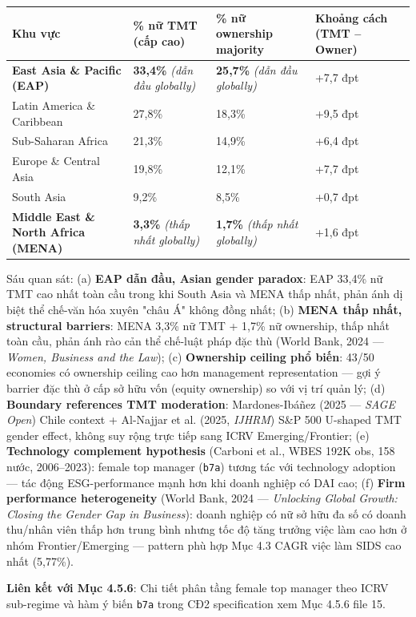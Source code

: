 \documentclass[12pt,a4paper]{article}
\begin{document}
\begin{longtable}[]{@{}llll@{}}
\toprule\noalign{}
Khu vực & \% nữ TMT (cấp cao) & \% nữ ownership majority & Khoảng cách
(TMT -- Owner) \\
\midrule\noalign{}
\endhead
\bottomrule\noalign{}
\endlastfoot
\textbf{East Asia \& Pacific (EAP)} & \textbf{33,4\%} \emph{(dẫn đầu
globally)} & \textbf{25,7\%} \emph{(dẫn đầu globally)} & +7,7 đpt \\
Latin America \& Caribbean & 27,8\% & 18,3\% & +9,5 đpt \\
Sub-Saharan Africa & 21,3\% & 14,9\% & +6,4 đpt \\
Europe \& Central Asia & 19,8\% & 12,1\% & +7,7 đpt \\
South Asia & 9,2\% & 8,5\% & +0,7 đpt \\
\textbf{Middle East \& North Africa (MENA)} & \textbf{3,3\%} \emph{(thấp
nhất globally)} & \textbf{1,7\%} \emph{(thấp nhất globally)} & +1,6
đpt \\
\end{longtable}

Sáu quan sát: (a) \textbf{EAP dẫn đầu, Asian gender paradox}: EAP 33,4\%
nữ TMT cao nhất toàn cầu trong khi South Asia và MENA thấp nhất, phản
ánh dị biệt thể chế-văn hóa xuyên "châu Á" không đồng nhất; (b)
\textbf{MENA thấp nhất, structural barriers}: MENA 3,3\% nữ TMT + 1,7\%
nữ ownership, thấp nhất toàn cầu, phản ánh rào cản thể chế-luật pháp đặc
thù (World Bank, 2024 --- \emph{Women, Business and the Law}); (c)
\textbf{Ownership ceiling phổ biến}: 43/50 economies có ownership
ceiling cao hơn management representation --- gợi ý barrier đặc thù ở
cấp sở hữu vốn (equity ownership) so với vị trí quản lý; (d)
\textbf{Boundary references TMT moderation}: Mardones-Ibáñez (2025 ---
\emph{SAGE Open}) Chile context + Al-Najjar et al. (2025, \emph{IJHRM})
S\&P 500 U-shaped TMT gender effect, không suy rộng trực tiếp sang ICRV
Emerging/Frontier; (e) \textbf{Technology complement hypothesis}
(Carboni et al., WBES 192K obs, 158 nước, 2006--2023): female top
manager (\texttt{b7a}) tương tác với technology adoption --- tác động
ESG-performance mạnh hơn khi doanh nghiệp có DAI cao; (f) \textbf{Firm
performance heterogeneity} (World Bank, 2024 --- \emph{Unlocking Global
Growth: Closing the Gender Gap in Business}): doanh nghiệp có nữ sở hữu
đa số có doanh thu/nhân viên thấp hơn trung bình nhưng tốc độ tăng
trưởng việc làm cao hơn ở nhóm Frontier/Emerging --- pattern phù hợp Mục
4.3 CAGR việc làm SIDS cao nhất (5,77\%).

\textbf{Liên kết với Mục 4.5.6}: Chi tiết phân tầng female top manager
theo ICRV sub-regime và hàm ý biến \texttt{b7a} trong CĐ2 specification
xem Mục 4.5.6 file 15.
\end{document}
